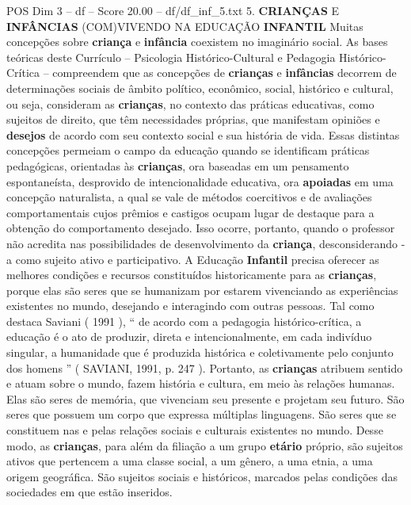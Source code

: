 \begin{textsample}{POS Dim 3 – df – Score 20.00 – df/df\_inf\_5.txt}  \label{ex:f3_pos_124}
5. \textbf{CRIANÇAS} E \textbf{INFÂNCIAS} (COM)VIVENDO NA EDUCAÇÃO \textbf{INFANTIL} Muitas concepções sobre \textbf{criança} e \textbf{infância} coexistem no imaginário social.
As bases teóricas deste Currículo – Psicologia Histórico-Cultural e Pedagogia Histórico-Crítica – compreendem que as concepções de \textbf{crianças} e \textbf{infâncias} decorrem de determinações sociais de âmbito político, econômico, social, histórico e cultural, ou seja, consideram as \textbf{crianças}, no contexto das práticas educativas, como sujeitos de direito, que têm necessidades próprias, que manifestam opiniões e \textbf{desejos} de acordo com seu contexto social e sua história de vida.
Essas distintas concepções permeiam o campo da educação quando se identificam práticas pedagógicas, orientadas às \textbf{crianças}, ora baseadas em um pensamento espontaneísta, desprovido de intencionalidade educativa, ora \textbf{apoiadas} em uma concepção naturalista, a qual se vale de métodos coercitivos e de avaliações comportamentais cujos prêmios e castigos ocupam lugar de destaque para a obtenção do comportamento desejado.
Isso ocorre, portanto, quando o professor não acredita nas possibilidades de desenvolvimento da \textbf{criança}, desconsiderando -a como sujeito ativo e participativo.
A Educação \textbf{Infantil} precisa oferecer as melhores condições e recursos constituídos historicamente para as \textbf{crianças}, porque elas são seres que se humanizam por estarem vivenciando as experiências existentes no mundo, desejando e interagindo com outras pessoas.
Tal como destaca Saviani ( 1991 ), “ de acordo com a pedagogia histórico-crítica, a educação é o ato de produzir, direta e intencionalmente, em cada indivíduo singular, a humanidade que é produzida histórica e coletivamente pelo conjunto dos homens ” ( SAVIANI, 1991, p. 247 ).
Portanto, as \textbf{crianças} atribuem sentido e atuam sobre o mundo, fazem história e cultura, em meio às relações humanas.
Elas são seres de memória, que vivenciam seu presente e projetam seu futuro.
São seres que possuem um corpo que expressa múltiplas linguagens.
São seres que se constituem nas e pelas relações sociais e culturais existentes no mundo.
Desse modo, as \textbf{crianças}, para além da filiação a um grupo \textbf{etário} próprio, são sujeitos ativos que pertencem a uma classe social, a um gênero, a uma etnia, a uma origem geográfica.
São sujeitos sociais e históricos, marcados pelas condições das sociedades em que estão inseridos.

\end{textsample}
